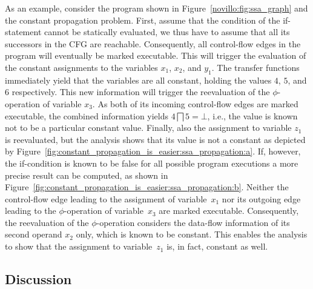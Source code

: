 \smallskip
As an example, consider the program shown in Figure~\ref{novillo:fig:ssa_graph}
and the constant propagation problem. First,
assume that the condition of the if-statement cannot be statically evaluated, 
we
thus have to assume that all its successors in the CFG are reachable.
Consequently, all control-flow edges in the program will eventually be marked
executable. This will trigger the evaluation of the constant assignments to
the variables $x_1$,  $x_2$, and $y_1$. The transfer functions immediately yield
that the variables are all constant, holding the values $4$, $5$, and $6$
respectively. This new information will trigger the reevaluation of the
$\phi$-operation of variable $x_3$. As both of its incoming control-flow edges
are marked executable, the combined information yields $4 \bigsqcap 5 = \bot$,
i.e., the value is known not to be a particular constant value. Finally, also
the assignment
to variable $z_1$ is reevaluated, but the analysis shows that its value is not a
constant as depicted by Figure~\ref{fig:constant_propagation_is_easier:ssa_propagation:a}. If, however,
the if-condition is known to be false for all possible program
executions a more precise result can be computed, as shown in
Figure~\ref{fig:constant_propagation_is_easier:ssa_propagation:b}.
Neither the control-flow edge leading to the
assignment of variable~$x_1$ nor its outgoing edge leading
to the $\phi$-operation of variable~$x_3$ are marked executable.
Consequently, the reevaluation of
the $\phi$-operation considers the data-flow information of its second operand
$x_2$ only, which is known to be constant. This enables the analysis
to show that the assignment to variable~$z_1$ is, in fact, constant as well.

\subsection{Discussion}

